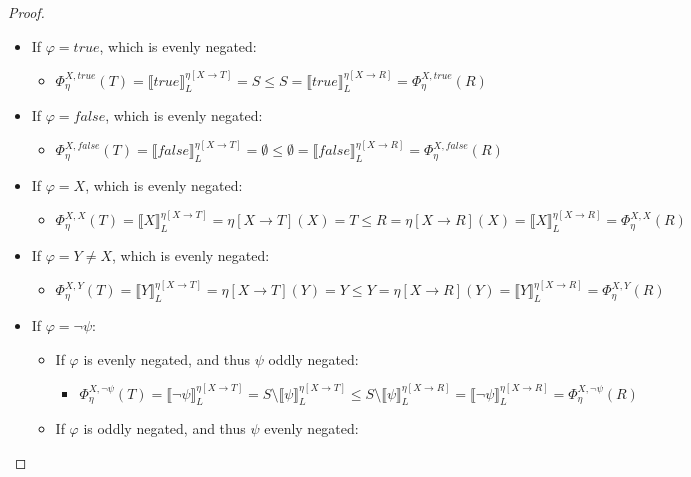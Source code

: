 \documentclass[11pt]{article}
\theoremstyle{definition}
\theoremstyle{plain}
\let\temp\phi
\let\phi\varphi
\let\varphi\temp
\begin{document}
\begin{appendices}
\begin{proof}
\begin{itemize}
\item If $ \phi = true$, which is evenly negated:
\begin{itemize}
\item $ \Phi_{\eta}^{X,true}(T) = \llbracket true \rrbracket_L^{\eta[X\rightarrow T]} = S \leq S = \llbracket true \rrbracket_L^{\eta[X\rightarrow R]} = \Phi_{\eta}^{X,true}(R)$
\end{itemize}
\item If $ \phi = false$, which is evenly negated:
\begin{itemize}
\item $ \Phi_{\eta}^{X,false}(T) = \llbracket false \rrbracket_L^{\eta[X\rightarrow T]} = \emptyset \leq \emptyset = \llbracket false \rrbracket_L^{\eta[X\rightarrow R]} = \Phi_{\eta}^{X,false}(R)$
\end{itemize}
\item If $ \phi = X$, which is evenly negated:
\begin{itemize}
\item $ \Phi_{\eta}^{X,X}(T) = \llbracket X \rrbracket_L^{\eta[X\rightarrow T]} = \eta[X\rightarrow T](X) = T \leq R = \eta[X\rightarrow R](X) = \llbracket X \rrbracket_L^{\eta[X\rightarrow R]} = \Phi_{\eta}^{X,X}(R)$
\end{itemize}
\item If $ \phi = Y \not= X$, which is evenly negated:
\begin{itemize}
\item $ \Phi_{\eta}^{X,Y}(T) = \llbracket Y \rrbracket_L^{\eta[X\rightarrow T]} = \eta[X\rightarrow T](Y) = Y \leq Y = \eta[X\rightarrow R](Y) = \llbracket Y \rrbracket_L^{\eta[X\rightarrow R]} = \Phi_{\eta}^{X,Y}(R)$
\end{itemize}
\item If $ \phi = \neg\psi$:
\begin{itemize}
\item If $ \phi $ is evenly negated, and thus $ \psi $ oddly negated:
\begin{itemize}
\item $ \Phi_{\eta}^{X,\neg\psi}(T) = \llbracket \neg\psi \rrbracket_L^{\eta[X\rightarrow T]} = S\setminus\llbracket \psi \rrbracket_L^{\eta[X\rightarrow T]} \leq S\setminus\llbracket \psi \rrbracket_L^{\eta[X\rightarrow R]} = \llbracket \neg\psi \rrbracket_L^{\eta[X\rightarrow R]} = \Phi_{\eta}^{X,\neg\psi}(R)$
\end{itemize}
\item If $ \phi $ is oddly negated, and thus $ \psi $ evenly negated:

\end{itemize}
\end{itemize}
\end{proof}
\end{appendices}
\end{document}
